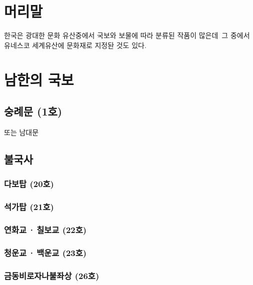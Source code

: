 \documentclass[a4paper,11pt]{book}%
\begin{document}
\begin{boxedminipage}[t]{\linewidth}

\tableofcontents		%
\end{boxedminipage}

\chapter*{머리말}
한국은 광대한 문화 유산중에서 국보와 보물에 따라 분류된 작품이 많은데\,\cite{k1} 그 중에서 유네스코 세계유산에 문화재로 지정돤 것도 있다.\cite{k2}

\chapter{남한의 국보}	%
\section{숭례문 (1호)}
또는 남대문
\section{불국사}
\subsection{다보탑 (20호)}
\subsection{석가탑 (21호)}
\subsection{연화교\,·\,칠보교 (22호)}
\subsection{청운교\,·\,백운교 (23호)}
\subsection{금동비로자나불좌상 (26호)}
\end{document}
